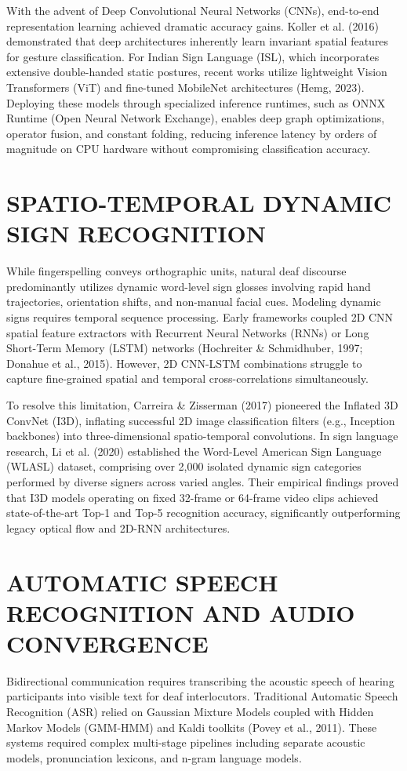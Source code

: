 \documentclass[12pt,a4paper]{report}
\begin{document}
With the advent of Deep Convolutional Neural Networks (CNNs), end-to-end representation learning achieved dramatic accuracy gains. Koller et al. (2016) demonstrated that deep architectures inherently learn invariant spatial features for gesture classification. For Indian Sign Language (ISL), which incorporates extensive double-handed static postures, recent works utilize lightweight Vision Transformers (ViT) and fine-tuned MobileNet architectures (Hemg, 2023). Deploying these models through specialized inference runtimes, such as ONNX Runtime (Open Neural Network Exchange), enables deep graph optimizations, operator fusion, and constant folding, reducing inference latency by orders of magnitude on CPU hardware without compromising classification accuracy.

\section{SPATIO-TEMPORAL DYNAMIC SIGN RECOGNITION} \label{sec:lit-dynamic}
While fingerspelling conveys orthographic units, natural deaf discourse predominantly utilizes dynamic word-level sign glosses involving rapid hand trajectories, orientation shifts, and non-manual facial cues. Modeling dynamic signs requires temporal sequence processing. Early frameworks coupled 2D CNN spatial feature extractors with Recurrent Neural Networks (RNNs) or Long Short-Term Memory (LSTM) networks (Hochreiter \& Schmidhuber, 1997; Donahue et al., 2015). However, 2D CNN-LSTM combinations struggle to capture fine-grained spatial and temporal cross-correlations simultaneously.

To resolve this limitation, Carreira \& Zisserman (2017) pioneered the Inflated 3D ConvNet (I3D), inflating successful 2D image classification filters (e.g., Inception backbones) into three-dimensional spatio-temporal convolutions. In sign language research, Li et al. (2020) established the Word-Level American Sign Language (WLASL) dataset, comprising over 2,000 isolated dynamic sign categories performed by diverse signers across varied angles. Their empirical findings proved that I3D models operating on fixed 32-frame or 64-frame video clips achieved state-of-the-art Top-1 and Top-5 recognition accuracy, significantly outperforming legacy optical flow and 2D-RNN architectures.

\section{AUTOMATIC SPEECH RECOGNITION AND AUDIO CONVERGENCE} \label{sec:lit-asr}
Bidirectional communication requires transcribing the acoustic speech of hearing participants into visible text for deaf interlocutors. Traditional Automatic Speech Recognition (ASR) relied on Gaussian Mixture Models coupled with Hidden Markov Models (GMM-HMM) and Kaldi toolkits (Povey et al., 2011). These systems required complex multi-stage pipelines including separate acoustic models, pronunciation lexicons, and n-gram language models.
\end{document}

